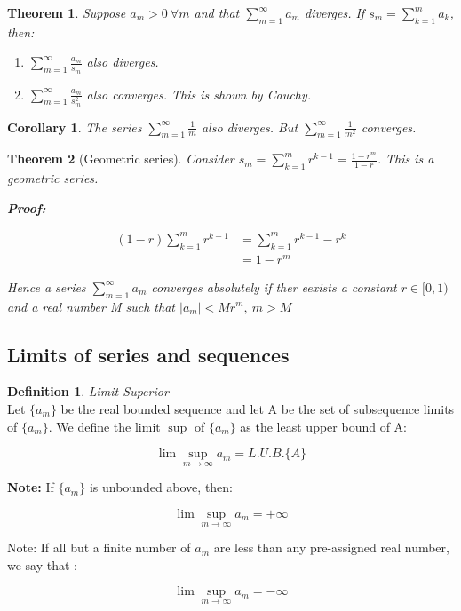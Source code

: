 \documentclass{article}
\newtheorem{theorem}{Theorem}[section]
\newtheorem{corollary}{Corollary}
\theoremstyle{definition}
\newtheorem{definition}{Definition}[section]
\newcommand{\Def}[2]{
\begin{shaded*}
\begin{definition}{\textit{#1}}\\#2\end{definition}
\end{shaded*}
}
\begin{document}
\begin{theorem}
Suppose $a_m>0\ \forall m$ and that $\sum_{m=1}^{\infty} a_m$ diverges. If $s_m = \sum_{k=1}^m a_k$, then:
\begin{enumerate}
	\item $\sum_{m=1}^{\infty} \frac{a_m}{s_m}$ also diverges.
	\item $\sum_{m=1}^{\infty} \frac{a_m}{s_m^2}$ also converges. This is shown by Cauchy. 
\end{enumerate}
\end{theorem}

\begin{corollary}
The series 	$\sum_{m=1}^{\infty} \frac{1}{m}$ also diverges. But $\sum_{m=1}^{\infty} \frac{1}{m^2}$ converges.
\end{corollary}

\begin{theorem}[Geometric series]
Consider $s_m = \sum_{k=1}^m r^{k-1} = \frac{1-r^m}{1-r}$. This is a geometric series.  

\textbf{Proof:}

\begin{align*}
(1-r)\sum_{k=1}^m r^{k-1} &= \sum_{k=1}^m r^{k-1} - r^k \\ 	
& = 1-r^m
\end{align*}

Hence a series $\sum_{m=1}^\infty a_m$ converges absolutely if ther eexists a constant $r \in [0,1)$ and a real number M such that $|a_m| < M r^m,\ m>M$
\end{theorem}

\subsection{Limits of series and sequences}
\Def{Limit Superior }{Let $\{a_m\}$ be the real bounded sequence and let A be the set of subsequence limits of $\{a_m\}$. We define the limit $\sup$ of $\{a_m\}$ as the least upper bound of A:

$$\lim\sup_{m \to \infty }a_m = L.U.B.\{A\}$$

\textbf{Note:} If $\{a_m\}$ is unbounded above, then:

$$\lim\sup_{m \to \infty }a_m = + \infty $$


Note: If all but a finite number of $a_m$ are less than any pre-assigned real number, we say that :

$$\lim\sup_{m \to \infty } a_m = - \infty $$
}
\end{document}
